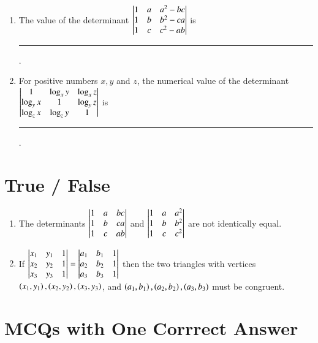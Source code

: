\documentclass[journal,12pt,twocolumn]{IEEEtran}
\theoremstyle{remark}
\begin{document}
\begin{enumerate}[label=\arabic*.]
	\item The value of the determinant $\begin{vmatrix}
			1 & a & a^2 - bc \\
			1 & b & b^2 - ca \\
			1 & c & c^2 - ab
		\end{vmatrix}$ is \rule{1cm}{0.15mm}.	
		\hfill {}

	\item For positive numbers $x, y$ and $z$, the numerical value of the determinant
		$\begin{vmatrix}
			1 & \log_x{y} & \log_x{z} \\
			\log_y{x} & 1 & \log_y{z} \\
			\log_z{x} & \log_z{y} & 1 \\
		\end{vmatrix}$ is \rule{1cm}{0.15mm}.
		\hfill {}
\end{enumerate}

\section{True / False}

\begin{enumerate}[label=\arabic*.]
	\item The determinants $\begin{vmatrix}
			1 & a & bc \\
			1 & b & ca \\
			1 & c & ab
		\end{vmatrix}$ and $\begin{vmatrix}
			1 & a & a^2 \\
			1 & b & b^2 \\
			1 & c & c^2
		\end{vmatrix}$ are not identically equal.
		\hfill {}
	
	\item If $\begin{vmatrix}
			x_1 & y_1 & 1 \\
			x_2 & y_2 & 1 \\
			x_3 & y_3 & 1
		\end{vmatrix} = \begin{vmatrix}
			a_1 & b_1 & 1 \\
			a_2 & b_2 & 1 \\
			a_3 & b_3 & 1
		\end{vmatrix}$ then the two triangles with vertices	
		$\left(x_1, y_1\right), \left(x_2, y_2\right), \left(x_3, y_3\right)$,
		and $\left(a_1, b_1\right), \left(a_2, b_2\right), \left(a_3, b_3\right)$
		must be congruent.
		\hfill {}
\end{enumerate}

\section{MCQs with One Corrrect Answer}
\end{document}
